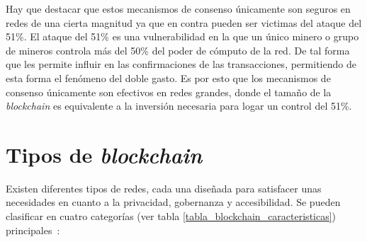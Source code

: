 Hay que destacar que estos mecanismos de consenso únicamente son seguros en redes de una cierta magnitud ya que en contra pueden ser victimas del ataque del 51\%.
El ataque del 51\% es una vulnerabilidad en la que un único minero o grupo de mineros controla más del 50\% del poder de cómputo de la red. De tal forma que les permite influir en las confirmaciones de las transacciones, permitiendo de esta forma el fenómeno del doble gasto.
Es por esto que los mecanismos de consenso únicamente son efectivos en redes grandes, donde el tamaño de la \textit{blockchain} es equivalente a la inversión necesaria para logar un control del 51\%.




\section{Tipos de \textit{blockchain}}

Existen diferentes tipos de redes, cada una diseñada para satisfacer unas necesidades en cuanto a la privacidad, gobernanza y accesibilidad. 
Se pueden clasificar en cuatro categorías (ver tabla \ref{tabla_blockchain_caracteristicas}) principales~\cite{introducciónBlockchain}:

